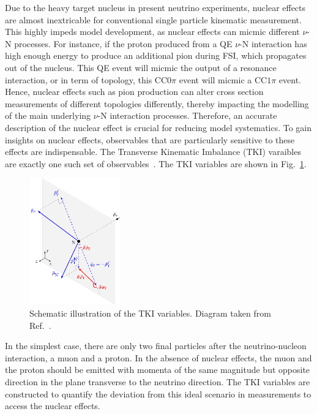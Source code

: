 
\label{sec:nuint-tki}
Due to the heavy target nucleus in present neutrino experiments, nuclear effects are almost inextricable for conventional single particle kinematic measurement.
This highly impeds model development, as nuclear effects can micmic different $\nu$-N processes.
For instance, if the proton produced from a QE $\nu$-N interaction has high enough energy to produce an additional pion during FSI, which propagates out of the nucleus.
This QE event will micmic the output of a resonance interaction, or in term of topology, this CC$0\pi$ event will micmic a CC$1\pi$ event.
Hence, nuclear effects such as pion production can alter cross section measurements of different topologies differently, thereby impacting the modelling of the main underlying $\nu$-N interaction processes.
Therefore, an accurate description of the nuclear effect is crucial for reducing model systematics.
To gain insights on nuclear effects, observables that are particularly sensitive to these effects are indispensable. 
The Transverse Kinematic Imbalance (TKI) varaibles are exactly one such set of observables~\cite{Lu:2015hea, Lu:2015tcr}.
The TKI variables are shown in Fig.~\ref{fig:stki}.
\begin{figure}[!htb] 	
    \centering 		
    \includegraphics[width=0.35\textwidth]{figures/stki.eps}
    \caption{\label{fig:stki} Schematic illustration of the TKI variables. Diagram taken from Ref.~\cite{Lu:2015tcr}.} 
\end{figure}
In the simplest case, there are only two final particles after the neutrino-nucleon interaction, a muon and a proton. 
In the absence of nuclear effects, the muon and the proton should be emitted with momenta of the same magnitude but opposite direction in the plane transverse to the neutrino direction.
The TKI variables are constructed to quantify the deviation from this ideal scenario in measurements to access the nuclear effects. 
